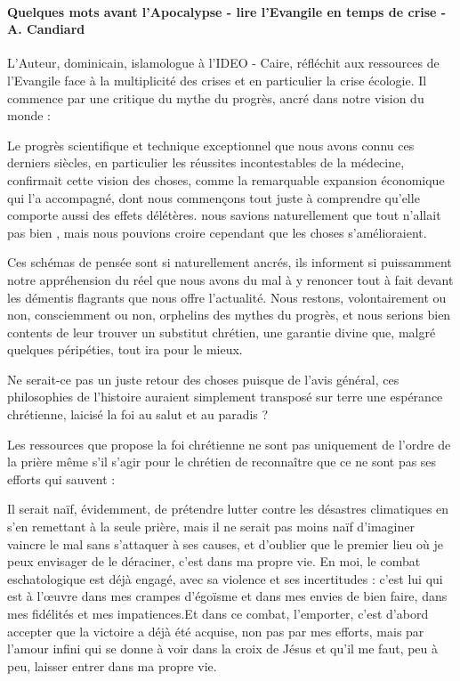 \paragraph{Quelques mots avant l'Apocalypse -  lire l’Evangile en temps de crise - A. Candiard}\cite{candiard_quelques_2022} L'Auteur, dominicain, islamologue à l'IDEO - Caire, réfléchit aux ressources de l'Evangile face à la multiplicité des crises et en particulier la crise écologie. Il commence par une critique du mythe du progrès, ancré dans notre vision du monde : 



\begin{singlequote}
        Le progrès scientifique et technique exceptionnel que nous avons connu ces derniers siècles, en particulier les réussites incontestables de la médecine, confirmait cette vision des choses, comme la remarquable expansion économique qui l’a accompagné, dont nous commençons tout juste à comprendre qu’elle comporte aussi des effets délétères. nous savions naturellement que tout n’allait pas bien , mais nous pouvions croire cependant que les choses s’amélioraient.

        Ces schémas de pensée sont si naturellement ancrés, ils informent si puissamment notre appréhension du réel que nous avons du mal à y renoncer tout à fait devant les démentis flagrants que nous offre l’actualité. Nous restons, volontairement ou non, consciemment ou non, orphelins des mythes du progrès, et nous serions bien contents de leur trouver un substitut chrétien, une garantie divine que, malgré quelques péripéties, tout ira pour le mieux.

        Ne serait-ce pas un juste retour des choses puisque de l’avis général, ces philosophies de l’histoire auraient simplement transposé sur terre une espérance chrétienne, laicisé la foi au salut et au paradis ? \cite[pp 89-91]{candiard_quelques_2022}
\end{singlequote}



Les ressources que propose la foi chrétienne ne sont pas uniquement de l'ordre de la prière même s'il s'agir pour le chrétien de reconnaître que ce ne sont pas ses efforts qui sauvent : 

 
\begin{singlequote}
    Il serait naïf, évidemment, de prétendre lutter contre les désastres climatiques en s'en remettant à la seule prière, mais il ne serait pas moins naïf d'imaginer vaincre le mal sans s'attaquer à ses causes, et d'oublier que le premier lieu où je peux envisager de le déraciner, c'est dans ma propre vie.
En moi, le combat eschatologique est déjà engagé, avec sa violence et ses incertitudes :
c'est lui qui est à l'œuvre dans mes crampes d’égoïsme et dans mes envies de bien faire, dans mes fidélités et mes impatiences.Et dans ce combat, l'emporter, c'est d'abord accepter que la victoire a déjà été acquise, non pas par mes efforts, mais par l'amour infini qui se donne à voir dans la croix de Jésus et qu'il me faut, peu à peu, laisser entrer dans ma propre vie. \cite[p.91]{candiard_quelques_2022} 
\end{singlequote}

